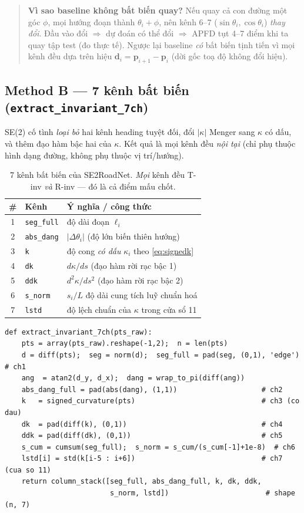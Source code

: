 \documentclass[11pt]{article}
\newcommand{\code}[1]{\textcolor{cInk}{\texttt{#1}}}
\newcommand{\kk}{\kappa}
\newcommand{\pt}{\mathbf{p}}
\theoremstyle{definition}
\begin{document}
\begin{quote}\small
\textbf{Vì sao baseline không bất biến quay?} Nếu quay cả con đường một góc
$\phi$, mọi hướng đoạn thành $\theta_i+\phi$, nên kênh 6--7
($\sin\theta_i,\cos\theta_i$) \emph{thay đổi}. Đầu vào đổi $\Rightarrow$ dự đoán
có thể đổi $\Rightarrow$ APFD tụt 4--7 điểm khi ta quay tập test (đo thực tế).
Ngược lại baseline \emph{có} bất biến tịnh tiến vì mọi kênh đều dựa trên hiệu
$\mathbf{d}_i=\pt_{i+1}-\pt_i$ (dời gốc toạ độ không đổi hiệu).
\end{quote}

\subsection{Method B --- 7 kênh bất biến (\code{extract\_invariant\_7ch})}
\label{sec:feat7}
SE(2) cố tình \emph{loại bỏ} hai kênh heading tuyệt đối, đổi $|\kk|$ Menger sang
$\kk$ có dấu, và thêm đạo hàm bậc hai của $\kk$. Kết quả là mọi kênh đều
\emph{nội tại} (chỉ phụ thuộc hình dạng đường, không phụ thuộc vị trí/hướng).

\begin{table}[H]\centering\small
\caption{7 kênh bất biến của SE2RoadNet. \emph{Mọi} kênh đều T-inv \emph{và}
R-inv --- đó là cả điểm mấu chốt.}
\label{tab:ch7}
\begin{tabular}{@{}c l l @{}}
\toprule
\# & Kênh & Ý nghĩa / công thức\\
\midrule
1 & \code{seg\_full}   & độ dài đoạn $\ell_i$\\
2 & \code{abs\_dang}   & $|\Delta\theta_i|$ (độ lớn biến thiên hướng)\\
3 & \code{k}           & độ cong \emph{có dấu} $\kk_i$ theo \eqref{eq:signedk}\\
4 & \code{dk}          & $d\kk/ds$ (đạo hàm rời rạc bậc 1)\\
5 & \code{ddk}         & $d^2\kk/ds^2$ (đạo hàm rời rạc bậc 2)\\
6 & \code{s\_norm}     & $s_i/L$ độ dài cung tích luỹ chuẩn hoá\\
7 & \code{lstd}        & độ lệch chuẩn của $\kk$ trong cửa sổ 11\\
\bottomrule
\end{tabular}
\end{table}

\begin{lstlisting}
def extract_invariant_7ch(pts_raw):
    pts = array(pts_raw).reshape(-1,2);  n = len(pts)
    d = diff(pts);  seg = norm(d);  seg_full = pad(seg, (0,1), 'edge')  # ch1
    ang  = atan2(d_y, d_x);  dang = wrap_to_pi(diff(ang))
    abs_dang_full = pad(abs(dang), (1,1))                    # ch2
    k   = signed_curvature(pts)                              # ch3 (co dau)
    dk  = pad(diff(k), (0,1))                                # ch4
    ddk = pad(diff(dk), (0,1))                               # ch5
    s_cum = cumsum(seg_full);  s_norm = s_cum/(s_cum[-1]+1e-8)  # ch6
    lstd[i] = std(k[i-5 : i+6])                              # ch7 (cua so 11)
    return column_stack([seg_full, abs_dang_full, k, dk, ddk,
                         s_norm, lstd])                       # shape (n, 7)
\end{lstlisting}
\end{document}
